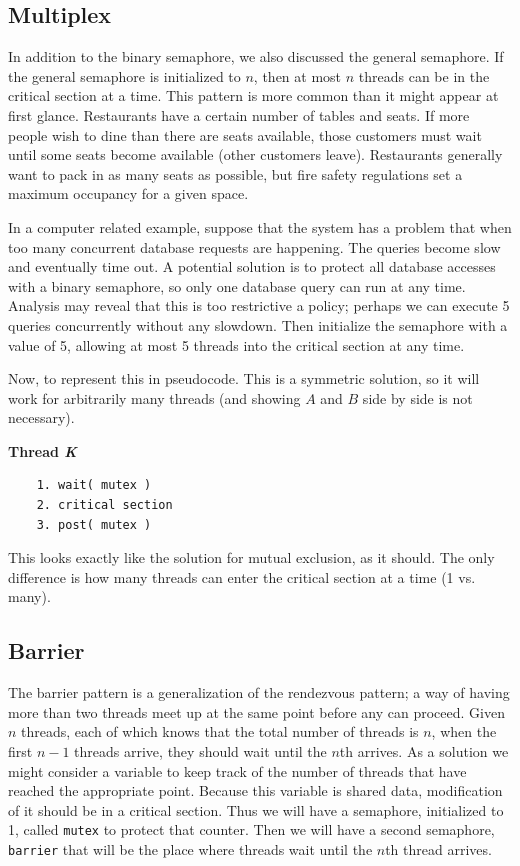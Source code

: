 \subsection*{Multiplex}
In addition to the binary semaphore, we also discussed the general semaphore. If the general semaphore is initialized to $n$, then at most $n$ threads can be in the critical section at a time. This pattern is more common than it might appear at first glance. Restaurants have a certain number of tables and seats. If more people wish to dine than there are seats available, those customers must wait until some seats become available (other customers leave). Restaurants generally want to pack in as many seats as possible, but fire safety regulations set a maximum occupancy for a given space.

In a computer related example, suppose that the system has a problem that when too many concurrent database requests are happening. The queries become slow and eventually time out. A potential solution is to protect all database accesses with a binary semaphore, so only one database query can run at any time. Analysis may reveal that this is too restrictive a policy; perhaps we can execute 5 queries concurrently without any slowdown. Then initialize the semaphore with a value of 5, allowing at most 5 threads into the critical section at any time.

Now, to represent this in pseudocode. This is a symmetric solution, so it will work for arbitrarily many threads (and showing $A$ and $B$ side by side is not necessary).

\textbf{Thread \textit{K}}\vspace{-2em}
\begin{verbatim}
	1. wait( mutex )
	2. critical section
	3. post( mutex )
  \end{verbatim}
\vspace{-2em}

This looks exactly like the solution for mutual exclusion, as it should. The only difference is how many threads can enter the critical section at a time (1 vs. many).


\subsection*{Barrier}
The barrier pattern is a generalization of the rendezvous pattern; a way of having more than two threads meet up at the same point before any can proceed. Given $n$ threads, each of which knows that the total number of threads is $n$, when the first $n-1$ threads arrive, they should wait until the $n$th arrives. As a solution we might consider a variable to keep track of the number of threads that have reached the appropriate point. Because this variable is shared data, modification of it should be in a critical section.  Thus we will have a semaphore, initialized to 1, called \texttt{mutex} to protect that counter. Then we will have a second semaphore, \texttt{barrier} that will be the place where threads wait until the $n$th thread arrives.


